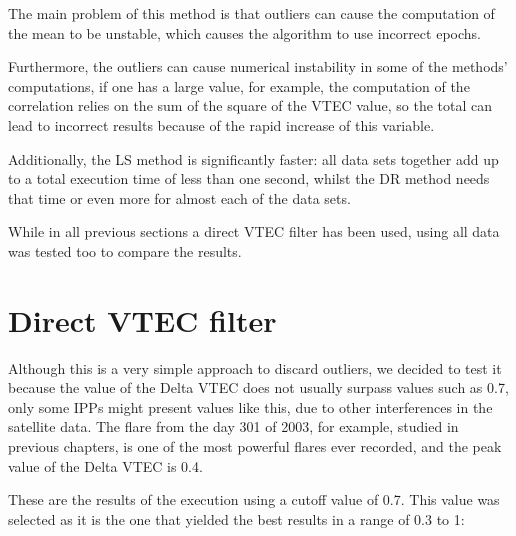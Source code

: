 The main problem of this method is that outliers can cause the computation of the mean to be unstable, which causes the algorithm to use incorrect epochs.

Furthermore, the outliers can cause numerical instability in some of the methods' computations, if one has a large value, for example, the computation of the correlation relies on the sum of the square of the VTEC value, so the total can lead to incorrect results because of the rapid increase of this variable.

Additionally, the LS method is significantly faster: all data sets together add up to a total execution time of less than one second, whilst the DR method needs that time or even more for almost each of the data sets.

While in all previous sections a direct VTEC filter has been used, using all data was tested too to compare the results.

\clearpage

\section{Direct VTEC filter}

Although this is a very simple approach to discard outliers, we decided to test it because the value of the Delta VTEC does not usually surpass values such as 0.7, only some IPPs might present values like this, due to other interferences in the satellite data. The flare from the day 301 of 2003, for example, studied in previous chapters, is one of the most powerful flares ever recorded, and the peak value of the Delta VTEC is 0.4.

These are the results of the execution using a cutoff value of 0.7. This value was selected as it is the one that yielded the best results in a range of 0.3 to 1:

